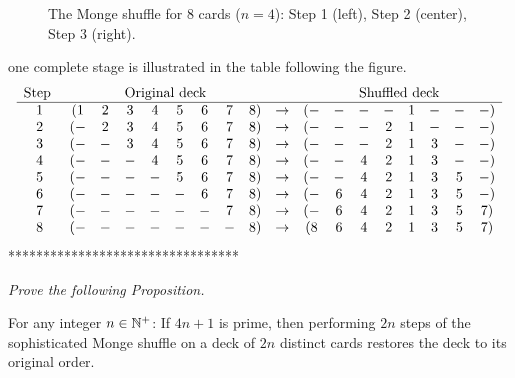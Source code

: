 \begin{itemize}
\begin{enumerate}
{\begin{figure}[h]
\begin{center}
        \caption{The Monge shuffle for $8$ cards ($n=4$): Step 1 (left), Step 2 (center), Step 3 (right).}
        \label{fig:suffleMonge1}
\end{center}
\end{figure}
one complete stage is illustrated in the table following the figure.
\[ \begin{array}{cccccccccccccccccc}
\mbox{Step } & \multicolumn{8}{c}{\mbox{Original deck}} & &
     \multicolumn{8}{c}{\mbox{Shuffled deck}} \\
\hline
1 & (1 & 2 & 3 & 4 & 5 & 6 & 7 & 8) & \rightarrow & ( - & - & - & - & 1 & - &  - & - ) \\
2 & ( - & 2 & 3 & 4 & 5 & 6 & 7 & 8) & \rightarrow & ( - & - & - & 2 & 1 & - & - & - ) \\
3 & ( - & - & 3 & 4 & 5 & 6 & 7 & 8) &  \rightarrow& ( - & - & - & 2 & 1 & 3 & - & - ) \\
4 & ( - & - & - & 4 & 5 & 6 & 7 & 8) &  \rightarrow& ( - & - & 4 & 2 & 1 & 3 & - & - ) \\
5 & ( - & - & - & - & 5 & 6 & 7 & 8) &  \rightarrow& ( - & - & 4 & 2 & 1 & 3 & 5 & - ) \\
6 & ( - & - & - & - & - & 6 & 7 & 8) &  \rightarrow& ( - & 6 & 4 & 2 & 1 & 3 & 5 & - ) \\
7 & ( - & - & - & - & - & - & 7 & 8) &  \rightarrow& ( - & 6 & 4 & 2 & 1 & 3 & 5 & 7 ) \\
8 & ( - & - & - & - & - & - & - & 8) &  \rightarrow& ( 8 & 6 & 4 & 2 & 1 & 3 & 5 & 7 ) \\
\end{array}
\]
*********************************}

\medskip

{\em Prove the following Proposition.}

For any integer $n \in \mathbb{N}^+$: 
If $4n+1$ is prime, then performing $2n$ steps of the sophisticated Monge shuffle on a deck of $2n$ distinct cards restores the deck to its original order.
\end{enumerate}
  
\end{itemize}





